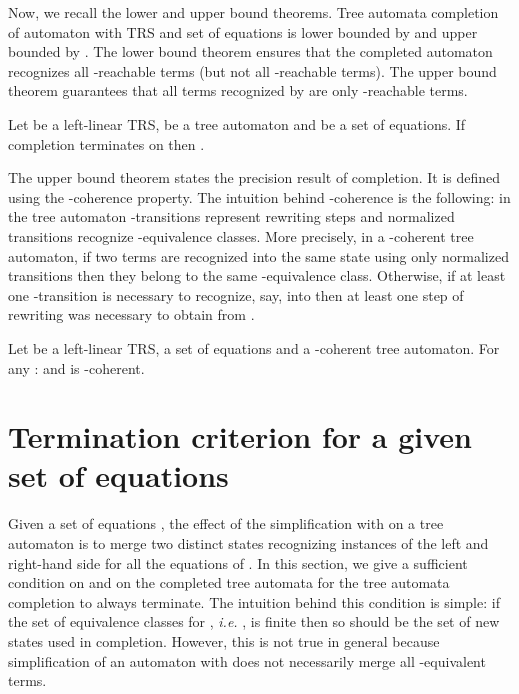 \documentclass[a4paper,11pt]{llncs}
\def \R {\mathcal{R}}
\newcommand{\desc}{\R^*}
\theoremstyle{plain}
\begin{document}
\noindent
Now, we recall the lower and upper bound theorems.  Tree automata completion of
automaton  with TRS  and set of equations  is lower bounded by
 and upper bounded by . The lower bound theorem 
ensures that the completed automaton  recognizes all -reachable
terms (but not all -reachable terms). The upper bound theorem guarantees
that all terms recognized by  are only -reachable terms. 

\begin{theorem}
  \label{completeness}
  Let  be a left-linear TRS,  be a tree automaton and  be a set of
  equations. If completion terminates on  then
.
\end{theorem}


\noindent
The upper bound theorem states the precision result of
completion. It is defined using the -coherence property.
The intuition behind -coherence is the following: in the tree automaton
-transitions represent rewriting steps and normalized transitions
recognize -equivalence classes. More precisely, in a -coherent tree
automaton, if two terms  are recognized into the same state   using
only normalized transitions then they belong to 
the same -equivalence class. Otherwise, if at least one
-transition is necessary to recognize, say,  into  then at
least one step of rewriting was necessary to obtain  from . 


\begin{theorem}
  \label{correctness}
  Let  be a left-linear TRS,  a set of equations and  a
  -coherent tree automaton. For any :
 and  is -coherent. \end{theorem}




\section{Termination criterion for a given set of equations}
\label{sec:termCrit}
\renewcommand{\desc}{\R^*}

Given a set of
equations , the effect of the simplification with  on a tree automaton is
to merge two distinct states recognizing instances of the left and right-hand
side for all the equations of . In this section, we give a sufficient
condition on  and on the completed tree automata  for the tree
automata completion to always terminate. The intuition behind this condition is
simple: if the set of equivalence classes for , {\em i.e.} ,  is finite then so should be
the set of new states used in completion. However, this is not true in general
because simplification of an automaton with  does not necessarily merge all
-equivalent terms.
\end{document}
